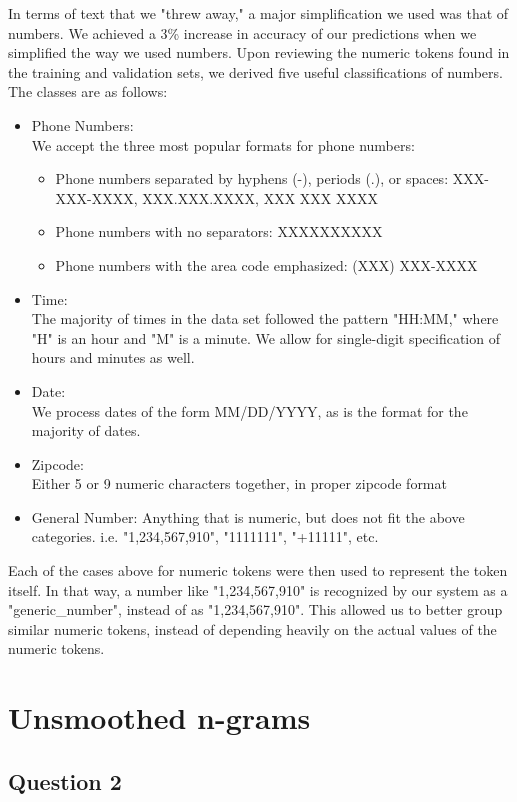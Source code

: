 \documentclass{article} %
\begin{document}
In terms of text that we "threw away," a major simplification we used was that of numbers. We achieved a 3\% increase in accuracy of our predictions when we simplified the way we used numbers. Upon reviewing the numeric tokens found in the training and validation sets, we derived five useful classifications of numbers. The classes are as follows:\\
\begin{itemize}
\item Phone Numbers:\\
We accept the three most popular formats for phone numbers: 
	\begin{itemize}
	\item Phone numbers separated by hyphens (-), periods (.), or spaces: XXX-XXX-XXXX, XXX.XXX.XXXX, XXX XXX XXXX
	\item Phone numbers with no separators: XXXXXXXXXX
	\item Phone numbers with the area code emphasized: (XXX) XXX-XXXX
	\end{itemize}
\item Time:\\
The majority of times in the data set followed the pattern "HH:MM," where "H" is an hour and "M" is a minute. We allow for single-digit specification of hours and minutes as well.
\item Date:\\
We process dates of the form MM/DD/YYYY, as is the format for the majority of dates.
\item Zipcode:\\
Either 5 or 9 numeric characters together, in proper zipcode format
\item General Number:
Anything that is numeric, but does not fit the above categories. i.e. "1,234,567,910", "1111111", "+11111", etc.
\end{itemize}

Each of the cases above for numeric tokens were then used to represent the token itself. In that way, a number like "1,234,567,910" is recognized by our system as a "generic\_number", instead of as "1,234,567,910". This allowed us to better group similar numeric tokens, instead of depending heavily on the actual values of the numeric tokens. 

\section{Unsmoothed n-grams}
\subsection*{Question 2}
\end{document}
